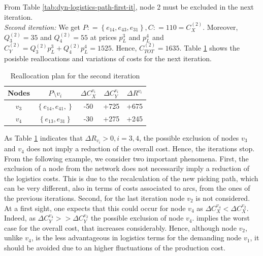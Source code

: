 From Table \ref{tab:dyn-logistics-path-first-it}, node 2 must be excluded in the next iteration.\\
\textit{Second iteration:}
We get $P : = \left\{e_{14}, e_{43}, e_{31}\right\}, C : = 110 = C_X^{(2)}$. Moreover, $Q_3^{(2)} = 35$ and $Q_4^{(2)} = 55$ at prices $p_L^3$ and $p_L^4$ and $C_Y^{(2)} = Q_3^{(2)} p_L^3 + Q_4^{(2)} p_L^4 = 1525$. Hence, $C_{TOT}^{(2)} = 1635$. Table \ref{tab:reallocation-plan-second-it} shows the posisble reallocations and variations of costs for the next iteration.

\begin{table}
    \centering
    \begin{tabular}{|c|c|c|c|c|}
        \hline
        \textbf{Nodes} & \textbf{$P \setminus v_i$} & \textbf{$\Delta C_X^{v_i}$} & \textbf{$\Delta C_Y^{v_i}$} & \textbf{$\Delta R^{v_i}$} \\
        \hline
        $v_3$ & $\left\{e_{14}, e_{41}, \right\}$ & -50 & +725 & +675 \\
        \hline
        $v_4$ & $\left\{e_{13}, e_{31} \right\}$ & -30 & +275 & +245 \\
        \hline
    \end{tabular}

    \caption{Reallocation plan for the second iteration}
    \label{tab:reallocation-plan-second-it}
\end{table}

As Table \ref{tab:reallocation-plan-second-it} indicates that $\Delta R_{v_i} > 0, i = 3,4$, the possible exclusion of nodes $v_3$ and $v_4$ does not imply a reduction of the overall cost. Hence, the iterations stop. From the following example, we consider two important phenomena. First, the exclusion of a node from the network does not necessarily imply a reduction of the logistics costs. This is due to the recalculation of the new picking path, which can be very different, also in terms of costs associated to arcs, from the ones of the previous iterations. Second, for the last iteration node $v_2$ is not considered. At a first sight, one expects that this could occur for node $v_4$ as $\Delta C_X^{v_4} < \Delta C_X^{v_2}$. Indeed, as $\Delta C_Y^{v_4} >> \Delta C_Y^{v_2}$ the possible exclusion of node $v_4$. implies the worst case for the overall cost, that increases considerably. Hence, although node $v_2$, unlike $v_4$, is the less advantageous in logistics terms for the demanding node $v_1$, it should be avoided due to an higher fluctuations of the production cost.\\
